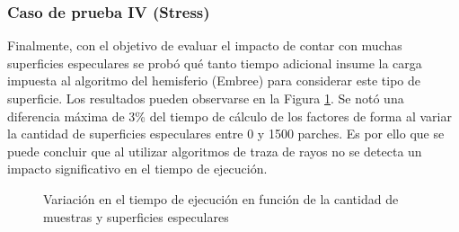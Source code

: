 \subsubsection{Caso de prueba IV (Stress)}

Finalmente, con el objetivo de evaluar el impacto de contar con muchas superficies especulares se probó qué tanto tiempo adicional insume la carga impuesta al algoritmo del hemisferio (Embree) para considerar este tipo de superficie. Los resultados pueden observarse en la Figura \ref{plot:este}. Se notó una diferencia máxima de 3\% del tiempo de cálculo de los factores de forma al variar la cantidad de superficies especulares entre 0 y 1500 parches. Es por ello que se puede concluir que al utilizar algoritmos de traza de rayos no se detecta un impacto significativo en el tiempo de ejecución.

\begin{figure}[htbp!]
	\centering
\caption{Variación en el tiempo de ejecución en función de la cantidad de muestras y superficies especulares}
\label{plot:este}
\end{figure}

